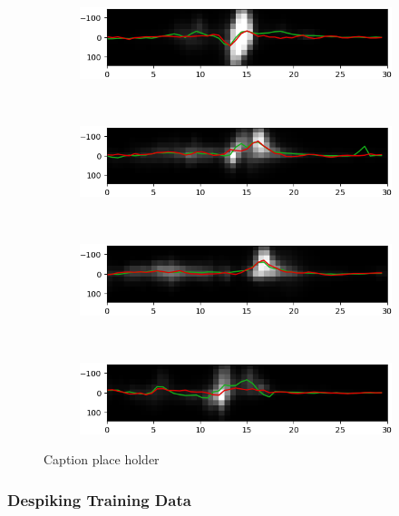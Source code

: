 \documentclass[10pt,letterpaper]{article}
\begin{document}
				\begin{figure}[t!]
					\centering
					\begin{subfigure}[t]{0.49\textwidth}
						\centering
						\includegraphics[width=\textwidth]{fig/doppler_1182}
					\end{subfigure}
					~ 
					\begin{subfigure}[t]{0.49\textwidth}
						\centering
						\includegraphics[width=\textwidth]{fig/doppler_1225}
					\end{subfigure}
					~ 
					\begin{subfigure}[t]{0.49\textwidth}
						\centering
						\includegraphics[width=\textwidth]{fig/doppler_1263}
					\end{subfigure}
					~ 
					\begin{subfigure}[t]{0.49\textwidth}
						\centering
						\includegraphics[width=\textwidth]{fig/doppler_1343}
					\end{subfigure}
					\caption{Caption place holder}
				\end{figure}
				
				
				
			\subsubsection{Despiking Training Data}	\label{sec_dspk}
		
\end{document}
